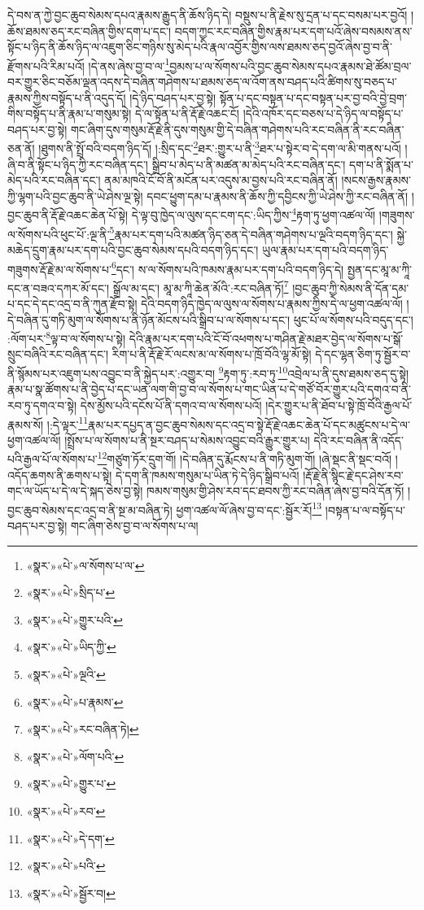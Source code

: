 དེ་བས་ན་ཀྱེ་བྱང་ཆུབ་སེམས་དཔའ་རྣམས་རྒྱུད་ནི་ཆོས་ཉིད་དེ། བསྡུས་པ་ནི་རྗེས་སུ་དྲན་པ་དང་བསམ་པར་བྱའོ། །ཆོས་ཐམས་ཅད་རང་བཞིན་གྱིས་དག་པ་དང་། བདག་ཀྱང་རང་བཞིན་གྱིས་རྣམ་པར་དག་པའོ་ཞེས་བསམས་ནས་སྟོང་པ་ཉིད་ནི་ཆོས་ཉིད་ལ་འཇུག་ཅིང་གཉིས་སུ་མེད་པའི་རྣལ་འབྱོར་གྱིས་ལས་ཐམས་ཅད་བྱའོ་ཞེས་བྱ་བ་ནི་རྫོགས་པའི་རིམ་པའོ། །དེ་ནས་ཞེས་བྱ་བ་ལ་\footnote{«སྣར་»«པེ་»ལ་སོགས་པ་ལ་}བྱམས་པ་ལ་སོགས་པའི་བྱང་ཆུབ་སེམས་དཔའ་རྣམས་ཐེ་ཚོམ་བྲལ་བར་གྱུར་ཅིང་བཅོམ་ལྡན་འདས་དེ་བཞིན་གཤེགས་པ་ཐམས་ཅད་ལ་འོག་ནས་བཤད་པའི་ཚིགས་སུ་བཅད་པ་རྣམས་ཀྱིས་བསྟོད་པ་ནི་འདུད་དོ། །དེ་ཉིད་བཤད་པར་བྱ་སྟེ། སྟོན་པ་དང་བསྟན་པ་དང་བསྟན་པར་བྱ་བའི་བྱེ་བྲག་གིས་བསྟོད་པ་ནི་རྣམ་པ་གསུམ་སྟེ། དེ་ལ་སྟོན་པ་ནི་རྡོ་རྗེ་འཆང་ངོ། །དེའི་འཁོར་དང་བཅས་པ་དེ་ཉིད་ལ་བསྟོད་པ་བཤད་པར་བྱ་སྟེ། གང་ཞིག་དུས་གསུམ་རྡོ་རྗེ་ནི་དུས་གསུམ་གྱི་དེ་བཞིན་གཤེགས་པའི་རང་བཞིན་ནི་རང་བཞིན་ཅན་ནོ། །ཐུགས་ནི་སྤྲོ་བའི་བདག་ཉིད་དོ། །:སྲིད་དང་\footnote{«སྣར་»«པེ་»སྲིད་པ་}ཐར་:གྱུར་པ་ནི་\footnote{«སྣར་»«པེ་»གྱུར་པའི་}ཐར་པ་སྟེར་བ་དེ་དག་ལ་མི་གནས་པའོ། །ཞི་བ་ནི་སྟོང་པ་ཉིད་ཀྱི་རང་བཞིན་དང་། སྒྲིབ་པ་མེད་པ་ནི་མཚན་མ་མེད་པའི་རང་བཞིན་དང་། དག་པ་ནི་སྨོན་པ་མེད་པའི་རང་བཞིན་དང་། ནམ་མཁའི་ངོ་བོ་ནི་མངོན་པར་འདུས་མ་བྱས་པའི་རང་བཞིན་ནོ། །སངས་རྒྱས་རྣམས་ཀྱི་ལྷག་པའི་བྱང་ཆུབ་ནི་ཡེ་ཤེས་ལྔ་སྟེ། དབང་ཕྱུག་དམ་པ་རྣམས་ནི་ཆོས་ཀྱི་དབྱིངས་ཀྱི་ཡེ་ཤེས་ཀྱི་རང་བཞིན་ནོ། །བྱང་ཆུབ་ནི་རྡོ་རྗེ་འཆང་ཆེན་པོ་སྟེ། དེ་ལྟ་བུ་ཁྱེད་ལ་ལུས་དང་ངག་དང་:ཡིད་ཀྱིས་\footnote{«སྣར་»«པེ་»ཡིད་ཀྱི་}རྟག་ཏུ་ཕྱག་འཚལ་ལོ། །གཟུགས་ལ་སོགས་པའི་ཕུང་པོ་:ལྔ་ནི་\footnote{«སྣར་»«པེ་»ལྔའི་}རྣམ་པར་དག་པའི་མཚན་ཉིད་ཅན་དེ་བཞིན་གཤེགས་པ་ལྔའི་བདག་ཉིད་དང་། སྐྱེ་མཆེད་དྲུག་རྣམ་པར་དག་པའི་བྱང་ཆུབ་སེམས་དཔའི་བདག་ཉིད་དང་། ཡུལ་རྣམ་པར་དག་པའི་བདག་ཉིད་གཟུགས་རྡོ་རྗེ་མ་ལ་སོགས་པ་\footnote{«སྣར་»«པེ་»པ་རྣམས་}དང་། ས་ལ་སོགས་པའི་ཁམས་རྣམ་པར་དག་པའི་བདག་ཉིད་དེ། སྤྱན་དང་མཱ་མ་ཀཱི་དང་ན་བཟའ་དཀར་མོ་དང་། སྒྲོལ་མ་དང་། མཱ་མ་ཀཱི་ཆེན་མོའི་:རང་བཞིན་ཏོ།\footnote{«སྣར་»«པེ་»རང་བཞིན་ཏེ།} །བྱང་ཆུབ་ཀྱི་སེམས་ནི་དོན་དམ་པ་དང་དེ་དང་འདྲ་བ་ནི་ཀུན་རྫོབ་སྟེ། དེའི་བདག་ཉིད་ཁྱེད་ལ་ལུས་ལ་སོགས་པ་རྣམས་ཀྱིས་དེ་ལ་ཕྱག་འཚལ་ལོ། །དེ་བཞིན་དུ་གཏི་མུག་ལ་སོགས་པ་ནི་ཉོན་མོངས་པའི་སྒྲིབ་པ་ལ་སོགས་པ་དང་། ཕུང་པོ་ལ་སོགས་པའི་བདུད་དང་། :ལོག་པར་\footnote{«སྣར་»«པེ་»ལོག་པའི་}ལྟ་བ་ལ་སོགས་པ་སྟེ། དེའི་རྣམ་པར་དག་པའི་ངོ་བོ་འཕགས་པ་གཤིན་རྗེ་མཐར་བྱེད་ལ་སོགས་པ་སྒོ་སྲུང་བཞིའི་རང་བཞིན་དང་། རིག་པ་ནི་རྡོ་རྗེ་རོ་ལངས་མ་ལ་སོགས་པ་ཁྲོ་བོའི་ལྷ་མོ་སྟེ། དེ་དང་ལྷན་ཅིག་ཏུ་སྦྱོར་བ་ནི་སྙོམས་པར་འཇུག་པས་འབྱུང་བ་ནི་སྐྱེད་པར་:འགྱུར་བ། \footnote{«སྣར་»«པེ་»གྱུར་པ་}རྟག་ཏུ་:རབ་ཏུ་\footnote{«སྣར་»«པེ་»རབ་}འབྲེལ་པ་ནི་དུས་ཐམས་ཅད་དུ་སྟེ། རྣམ་པ་སྣ་ཚོགས་པ་ནི་བྱེད་པ་དང་ཡན་ལག་གི་བྱ་བ་ལ་སོགས་པ་གང་ཡིན་པ་དེ་གཙོ་བོར་གྱུར་པའི་དགའ་བ་ནི་རབ་ཏུ་དགའ་བ་སྟེ། དེས་མྱོས་པའི་དངོས་པོ་ནི་དགའ་བ་ལ་སོགས་པའོ། །དེར་གྱུར་པ་ནི་ཐོབ་པ་སྟེ་ཁྲོ་བོའི་རྒྱལ་པོ་རྣམས་སོ། །:དེ་ལྟར་\footnote{«སྣར་»«པེ་»དེ་དག་}རྣམ་པར་དཔྱད་ན་བྱང་ཆུབ་སེམས་དང་འདྲ་བ་སྟེ་རྡོ་རྗེ་འཆང་ཆེན་པོ་དང་མཚུངས་པ་དེ་ལ་ཕྱག་འཚལ་ལོ། །སྤྲོས་པ་ལ་སོགས་པ་ནི་སྔར་བཤད་པ་སེམས་འབྱུང་བའི་རྒྱུར་གྱུར་པ། དེའི་རང་བཞིན་ནི་འདོད་པའི་རྒྱལ་པོ་ལ་སོགས་པ་\footnote{«སྣར་»«པེ་»པའི་}གཙུག་ཏོར་དྲུག་གོ། །དེ་བཞིན་དུ་རྨོངས་པ་ནི་གཏི་མུག་གོ། །ཞེ་སྡང་ནི་སྡང་བའོ། །འདོད་ཆགས་ནི་ཆགས་པ་སྟེ། དེ་དག་ནི་ཁམས་གསུམ་པ་ཡིན་ཏེ་དེ་ཉིད་སྒྲིབ་པའོ། །རྡོ་རྗེ་ནི་སྙིང་རྗེ་དང་ཤེས་རབ་གང་ལ་ཡོད་པ་དེ་ལ་དེ་སྐད་ཅེས་བྱ་སྟེ། ཁམས་གསུམ་གྱི་ཤེས་རབ་དང་ཐབས་ཀྱི་རང་བཞིན་ཞེས་བྱ་བའི་དོན་ཏོ། །བྱང་ཆུབ་སེམས་དང་འདྲ་བ་ནི་སྔ་མ་བཞིན་ཏེ། ཕྱག་འཚལ་ལོ་ཞེས་བྱ་བ་དང་:སྦྱོར་རོ།\footnote{«སྣར་»«པེ་»སྦྱོར་བ།} །བསྟན་པ་ལ་བསྟོད་པ་བཤད་པར་བྱ་སྟེ། གང་ཞིག་ཅེས་བྱ་བ་ལ་སོགས་པ་ལ། 